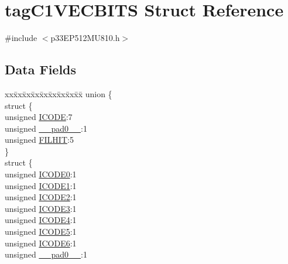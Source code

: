 \hypertarget{structtag_c1_v_e_c_b_i_t_s}{}\section{tag\+C1\+V\+E\+C\+B\+I\+TS Struct Reference}
\label{structtag_c1_v_e_c_b_i_t_s}


{\ttfamily \#include $<$p33\+E\+P512\+M\+U810.\+h$>$}

\subsection*{Data Fields}
\begin{DoxyCompactItemize}
\item 
\begin{tabbing}
xx\=xx\=xx\=xx\=xx\=xx\=xx\=xx\=xx\=\kill
union \{\\
\>struct \{\\
\>\>unsigned \hyperlink{structtag_c1_v_e_c_b_i_t_s_a7c445e6c602ab0d39d6a30ba56be353c}{ICODE}:7\\
\>\>unsigned \hyperlink{structtag_c1_v_e_c_b_i_t_s_adf71f3d8410c1f1dbbc96680a92c49af}{\_\_pad0\_\_}:1\\
\>\>unsigned \hyperlink{structtag_c1_v_e_c_b_i_t_s_af516176ac93a65e20c10fc4f03eca15b}{FILHIT}:5\\
\>\} \\
\>struct \{\\
\>\>unsigned \hyperlink{structtag_c1_v_e_c_b_i_t_s_ae58a73de898f481f87a7659a557a16d5}{ICODE0}:1\\
\>\>unsigned \hyperlink{structtag_c1_v_e_c_b_i_t_s_ab9c9f20dcc5c97d353556f665f96c3ca}{ICODE1}:1\\
\>\>unsigned \hyperlink{structtag_c1_v_e_c_b_i_t_s_a7b87cd62d9b4d47b4835bbfd3d83c0c8}{ICODE2}:1\\
\>\>unsigned \hyperlink{structtag_c1_v_e_c_b_i_t_s_a00f39c3c36b114bcd0f0c93255c5dc39}{ICODE3}:1\\
\>\>unsigned \hyperlink{structtag_c1_v_e_c_b_i_t_s_a436cd58140bad7a64953df17114bb50e}{ICODE4}:1\\
\>\>unsigned \hyperlink{structtag_c1_v_e_c_b_i_t_s_af29df0fe9fa862b03f7a3dc52a2fcca5}{ICODE5}:1\\
\>\>unsigned \hyperlink{structtag_c1_v_e_c_b_i_t_s_aec0244cced0a8f2c1703bb463f77de4b}{ICODE6}:1\\
\>\>unsigned \hyperlink{structtag_c1_v_e_c_b_i_t_s_adf71f3d8410c1f1dbbc96680a92c49af}{\_\_pad0\_\_}:1\\

\end{tabbing}
\end{DoxyCompactItemize}
